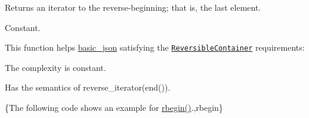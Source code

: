 Returns an iterator to the reverse-\/beginning; that is, the last element.

  Constant.

This function helps {\ttfamily \hyperlink{classnlohmann_1_1basic__json}{basic\-\_\-json}} satisfying the \href{http://en.cppreference.com/w/cpp/concept/ReversibleContainer}{\tt Reversible\-Container} requirements\-:
\begin{DoxyItemize}
\item The complexity is constant.
\item Has the semantics of {\ttfamily reverse\-\_\-iterator(end())}.
\end{DoxyItemize}

\{The following code shows an example for {\ttfamily \hyperlink{classnlohmann_1_1basic__json_a62ccf5b9b3674aec2403fbc02da03db8}{rbegin()}}.,rbegin\}

